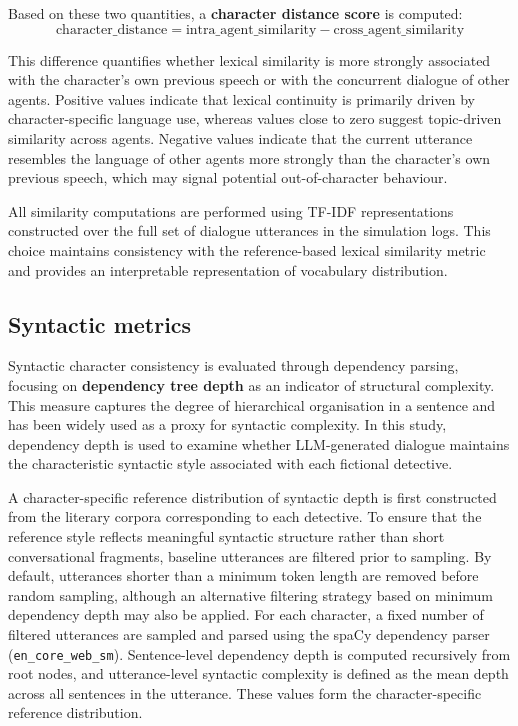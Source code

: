 \documentclass{article}
\begin{document}
Based on these two quantities, a \textbf{character distance score} is computed:
\begin{equation}
    \text{character\_distance} = \text{intra\_agent\_similarity} - \text{cross\_agent\_similarity}
    \label{eq:lexical_chardistance}
\end{equation}

This difference quantifies whether lexical similarity is more strongly associated with the character’s own previous speech or with the concurrent dialogue of other agents. Positive values indicate that lexical continuity is primarily driven by character-specific language use, whereas values close to zero suggest topic-driven similarity across agents. Negative values indicate that the current utterance resembles the language of other agents more strongly than the character’s own previous speech, which may signal potential out-of-character behaviour.

All similarity computations are performed using TF-IDF representations constructed over the full set of dialogue utterances in the simulation logs. This choice maintains consistency with the reference-based lexical similarity metric and provides an interpretable representation of vocabulary distribution.

\subsection{Syntactic metrics}

Syntactic character consistency is evaluated through dependency parsing, focusing on \textbf{dependency tree depth} as an indicator of structural complexity. This measure captures the degree of hierarchical organisation in a sentence and has been widely used as a proxy for syntactic complexity. In this study, dependency depth is used to examine whether LLM-generated dialogue maintains the characteristic syntactic style associated with each fictional detective.

A character-specific reference distribution of syntactic depth is first constructed from the literary corpora corresponding to each detective. To ensure that the reference style reflects meaningful syntactic structure rather than short conversational fragments, baseline utterances are filtered prior to sampling. By default, utterances shorter than a minimum token length are removed before random sampling, although an alternative filtering strategy based on minimum dependency depth may also be applied. For each character, a fixed number of filtered utterances are sampled and parsed using the spaCy dependency parser (\texttt{en\_core\_web\_sm}). Sentence-level dependency depth is computed recursively from root nodes, and utterance-level syntactic complexity is defined as the mean depth across all sentences in the utterance. These values form the character-specific reference distribution.
\end{document}
